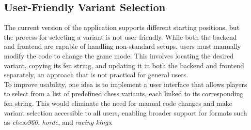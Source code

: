 \subsection{User-Friendly Variant Selection}
The current version of the application supports different starting positions, but the process for selecting a variant is not user-friendly. While both the backend and frontend are capable of handling non-standard setups, users must manually modify the code to change the game mode. This involves locating the desired variant, copying its \gls{fen} string, and updating it in both the backend and frontend separately, an approach that is not practical for general users. \\

To improve usability, one idea is to implement a user interface that allows players to select from a list of predefined chess variants, each linked to its corresponding \gls{fen} string. This would eliminate the need for manual code changes and make variant selection accessible to all users, enabling broader support for formats such as \textit{\gls{chess960}}, \textit{\gls{horde}}, and \textit{\gls{racing-kings}}.


